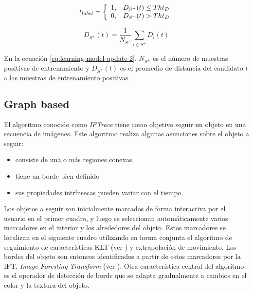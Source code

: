 \documentclass[a4paper,10pt]{article}
\begin{document}
\begin{equation}
    \label{eq:learning-model-update-1}
    t_{label} = \left\{
                \begin{array}{l l}
                    1, & D_{S^{+}}(t) \leq Tht_{D}\\
                    0, & D_{S^{+}}(t) >  Tht_{D}
                \end{array} \right.
\end{equation}

\begin{equation}
    \label{eq:learning-model-update-2}
    D_{S^{+}}(t) = \dfrac{1}{N_{S^{+}}} \sum_{i \in S^{+}} D_{i}(t)
\end{equation}

En la ecuación \ref{eq:learning-model-update-2}, $N_{S^{+}}$ es el
número de muestras positivas de entrenamiento y $D_{S^{+}}(t)$
es el promedio de distancia del candidato $t$ a las muestras
de entrenamiento positivas.

\subsection{Graph based}

El algoritmo conocido como \textit{IFTrace} \cite{IFTrace} tiene como objetivo
seguir un objeto en una secuencia de imágenes. Este algoritmo realiza algunas
asunciones sobre el objeto a seguir:

\begin{itemize}
    \item consiste de una o más regiones conexas,
    \item tiene un borde bien definido
    \item sus propiedades intrínsecas pueden variar con el tiempo.
\end{itemize}

Los objetos a seguir son inicialmente marcados de forma interactiva por el
usuario en el primer cuadro, y luego se seleccionan automáticamente varios
marcadores en el interior y los alrededores del objeto. Estos marcadores se
localizan en el siguiente cuadro utilizando en forma conjunta el algoritmo de
seguimiento de características KLT (ver \cite{KLT}) y extrapolación de
movimiento. Los bordes del objeto son entonces identificados a partir de estos
marcadores por la IFT, \textit{Image Foresting Transform} (ver \cite{IFT}).
Otra característica central del algoritmo es el operador de detección de borde
que se adapta gradualmente a cambios en el color y la textura del objeto.
\end{document}
